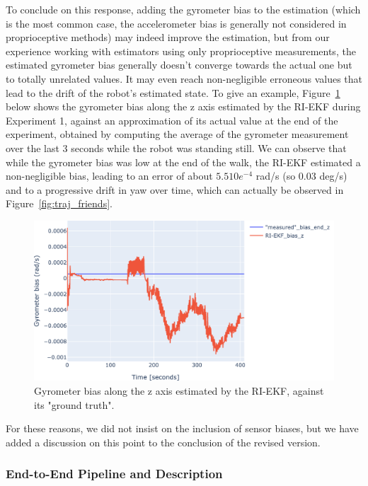 To conclude on this response, adding the gyrometer bias to the estimation (which is the most common case, the accelerometer bias is generally not considered in proprioceptive methods) may indeed improve the estimation, but from our experience working with estimators using only proprioceptive measurements, the estimated gyrometer bias generally doesn't converge towards the actual one but to totally unrelated values. It may even reach non-negligible erroneous values that lead to the drift of the robot's estimated state. To give an example, Figure~\ref{fig:bias} below shows the gyrometer bias along the z axis estimated by the RI-EKF during Experiment 1, against an approximation of its actual value at the end of the experiment, obtained by computing the average of the gyrometer measurement over the last 3 seconds while the robot was standing still. We can observe that while the gyrometer bias was low at the end of the walk, the RI-EKF estimated a non-negligible bias, leading to an error of about $5.5 10e^{-4}$ rad/s (so 0.03 deg/s) and to a progressive drift in yaw over time, which can actually be observed in Figure~\ref{fig:traj_friends}.

\begin{figure}[!ht]
\begin{center}
\includegraphics[width=\textwidth]{bias_z.pdf} 
\vskip -0.5pc
\caption{Gyrometer bias along the z axis estimated by the RI-EKF, against its "ground truth".}\label{fig:bias}
\end{center}
\vskip -1.5pc
\end{figure}

For these reasons, we did not insist on the inclusion of sensor biases, but we have added a discussion on this point to the conclusion of the revised version.


 

\subsubsection{End-to-End Pipeline and Description}




